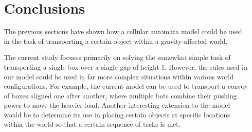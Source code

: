\section{Conclusions}
\label{sec:concl}
The previous sections have shown how a cellular automata model could be used in the task of transporting a certain object within a gravity-affected world. 

The current study focuses primarily on solving the somewhat simple task of transporting a single box over a single gap of height 1. However, the rules used in our model could be used in far more complex situations within various world configurations. For example, the current model can be used to transport a convoy of boxes aligned one after another, where multiple bots combine their pushing power to move the heavier load. Another interesting extension to the model would be to determine its use in placing certain objects at specific locations within the world so that a certain sequence of tasks is met. 
